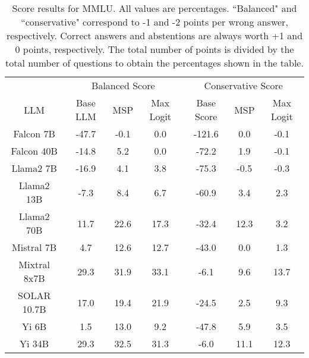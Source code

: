 \renewcommand\arraystretch{1.2}
\begin{table*}
\centering
\begin{tabular}{c|c|c|c|c|c|c}
& \multicolumn{3}{c|}{Balanced Score} & \multicolumn{3}{c}{Conservative Score} \\ 
LLM & Base LLM & MSP & Max Logit & Base Score & MSP & Max Logit\\ \hline
Falcon 7B & -47.7 & -0.1 & 0.0 & -121.6 & 0.0 & -0.1\\
Falcon 40B & -14.8 & 5.2 & 0.0 & -72.2 & 1.9 & -0.1\\
Llama2 7B & -16.9 & 4.1 & 3.8 & -75.3 & -0.5 & -0.3\\
Llama2 13B & -7.3 & 8.4 & 6.7 & -60.9 & 3.4 & 2.3\\
Llama2 70B & 11.7 & 22.6 & 17.3 & -32.4 & 12.3 & 3.2\\
Mistral 7B & 4.7 & 12.6 & 12.7 & -43.0 & 0.0 & 1.3\\
Mixtral 8x7B & 29.3 & 31.9 & 33.1 & -6.1 & 9.6 & 13.7\\
SOLAR 10.7B & 17.0 & 19.4 & 21.9 & -24.5 & 2.5 & 9.3\\
Yi 6B & 1.5 & 13.0 & 9.2 & -47.8 & 5.9 & 3.5\\
Yi 34B & 29.3 & 32.5 & 31.3 & -6.0 & 11.1 & 12.3\\
\hline
\end{tabular}
\caption{Score results for MMLU. All values are percentages. ``Balanced" and ``conservative" correspond to -1 and -2 points per wrong answer, respectively. Correct answers and abstentions are always worth +1 and 0 points, respectively. The total number of points is divided by the total number of questions to obtain the percentages shown in the table.}
\label{tab:mmlu_score}
\end{table*}
